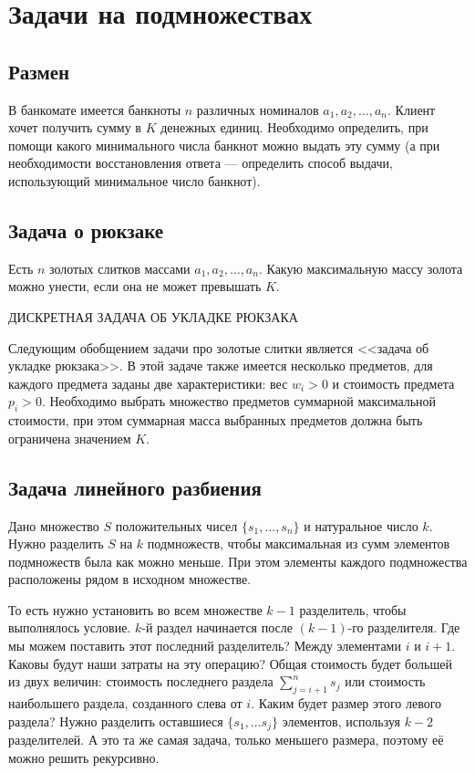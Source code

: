 \documentclass[14pt,openany]{book}
\begin{document}
\chapter{Задачи на подмножествах}

\section{Размен}

В банкомате имеется банкноты $n$ различных номиналов $a_1, a_2, \ldots, a_n$. Клиент хочет получить сумму в $K$ денежных единиц. Необходимо определить, при помощи какого минимального числа банкнот можно выдать эту сумму (а при необходимости восстановления ответа --- определить способ выдачи, использующий минимальное число банкнот).

\section{Задача о рюкзаке}

Есть $n$ золотых слитков массами $a_1, a_2, \ldots, a_n$. Какую максимальную массу золота можно унести, если она не может превышать $K$.

ДИСКРЕТНАЯ ЗАДАЧА ОБ УКЛАДКЕ РЮКЗАКА

Следующим обобщением задачи про золотые слитки является <<задача об укладке рюкзака>>. В этой задаче также имеется несколько предметов, для каждого предмета заданы две характеристики: вес $w_i > 0$ и стоимость предмета $p_i > 0$. Необходимо выбрать множество предметов суммарной максимальной стоимости, при этом суммарная масса выбранных предметов должна быть ограничена значением $K$.

\section{Задача линейного разбиения}

Дано множество $S$ положительных чисел $\{s_1, \ldots , s_n\}$ и натуральное число $k$.
Нужно разделить $S$ на $k$ подмножеств, чтобы максимальная из сумм элементов подмножеств была 
как можно меньше. При этом элементы каждого подмножества расположены рядом в исходном множестве.

То есть нужно установить во всем множестве $k-1$ разделитель, чтобы выполнялось условие.
$k$-й раздел начинается после $(k-1)$-го разделителя. Где мы можем поставить этот последний
разделитель? Между элементами $i$ и $i+1$. Каковы будут наши затраты на эту операцию?
Общая стоимость будет большей из двух величин: стоимость последнего раздела $\sum_{j=i+1}^{n}s_j$
или стоимость наибольшего раздела, созданного слева от $i$. Каким будет размер этого левого раздела?
Нужно разделить оставшиеся $\{s_1,\ldots s_j\}$ элементов, используя $k-2$ разделителей.
А это та же самая задача, только меньшего размера, поэтому её можно решить рекурсивно.
\end{document}
